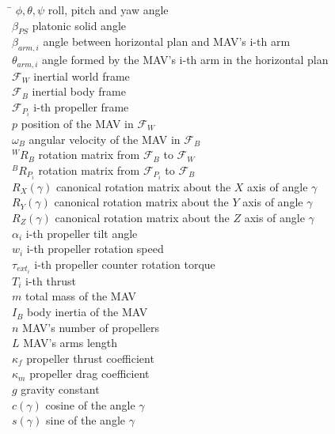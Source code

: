 \begin{tabbing}
 \hspace*{1.6cm} \= \kill
  $\phi, \theta, \psi$    \> roll, pitch and yaw angle \\[0.5ex]
  $\beta_{PS}$    \> platonic solid angle \\[0.5ex]
  $\beta_{arm,i}$    \> angle between horizontal plan and MAV's i-th arm \\[0.5ex]
  $\theta_{arm,i}$   \> angle formed by the MAV's i-th arm in the horizontal plan\\[0.5ex]
  $\mathcal{F}_{W}$   \> inertial world frame \\[0.5ex]
  $\mathcal{F}_{B}$   \> inertial body frame \\[0.5ex]
  $\mathcal{F}_{P_{i}}$   \> i-th propeller frame \\[0.5ex]
  $p$   \> position of the MAV in $\mathcal{F}_{W}$ \\[0.5ex]
  $\omega_{B}$    \> angular velocity of the MAV in $\mathcal{F}_{B}$\\[0.5ex]
  $^{W}R_{B}$   \> rotation matrix from $\mathcal{F}_{B}$ to $\mathcal{F}_{W}$\\[0.5ex]
  $^{B}R_{P_{i}}$  \> rotation matrix from $\mathcal{F}_{P_{i}}$ to $\mathcal{F}_{B}$\\[0.5ex]
  $R_{X}(\gamma)$   \> canonical rotation matrix about the $X$ axis of angle $\gamma$\\[0.5ex]
  $R_{Y}(\gamma)$   \> canonical rotation matrix about the $Y$ axis of angle $\gamma$\\[0.5ex]
  $R_{Z}(\gamma)$   \> canonical rotation matrix about the $Z$ axis of angle $\gamma$\\[0.5ex]
  $\alpha_{i}$    \> i-th propeller tilt angle\\[0.5ex]
  $w_{i}$    \> i-th propeller rotation speed\\[0.5ex]
  $\tau_{ext_{i}}$    \> i-th propeller counter rotation torque\\[0.5ex]
  $T_{i}$    \> i-th thrust\\[0.5ex]
  $m$    \> total mass of the MAV\\[0.5ex]
  $I_{B}$    \> body inertia of the MAV\\[0.5ex]
  $n$    \> MAV's number of propellers\\[0.5ex]
  $L$    \> MAV's arms length\\[0.5ex]
  $\kappa_{f}$    \> propeller thrust coefficient\\[0.5ex]
  $\kappa_{m}$    \> propeller drag coefficient\\[0.5ex]
  $g$    \> gravity constant\\[0.5ex]
  $c(\gamma)$   \> cosine of the angle $\gamma$\\[0.5ex]
  $s(\gamma)$   \> sine of the angle $\gamma$\\[0.5ex]
\end{tabbing}

